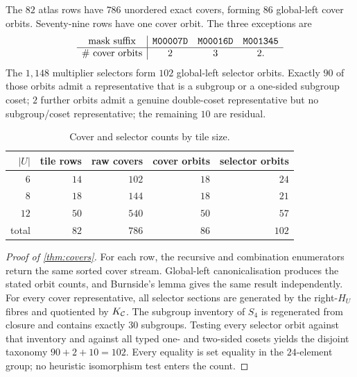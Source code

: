 \begin{theorem}\label{thm:covers}
The $82$ atlas rows have $786$ unordered exact covers, forming $86$
global-left cover orbits.  Seventy-nine rows have one cover orbit.  The three
exceptions are
\[
\begin{array}{c|ccc}
\text{mask suffix}&\texttt{M00007D}&\texttt{M00016D}&\texttt{M001345}\\ \hline
\#\text{ cover orbits}&2&3&2.
\end{array}
\]
The $1{,}148$ multiplier selectors form $102$ global-left selector orbits.
Exactly $90$ of those orbits admit a representative that is a subgroup or a
one-sided subgroup coset; $2$ further orbits admit a genuine double-coset
representative but no subgroup/coset representative; the remaining $10$ are
residual.
\end{theorem}

\begin{table}[ht]
\centering
\caption{Cover and selector counts by tile size.}
\label{tab:cover-by-k}
\begin{tabular}{@{}rrrrr@{}}
\toprule
$|U|$ & tile rows & raw covers & cover orbits & selector orbits\\
\midrule
$6$  & $14$ & $102$ & $18$ & $24$\\
$8$  & $18$ & $144$ & $18$ & $21$\\
$12$ & $50$ & $540$ & $50$ & $57$\\
\midrule
total & $82$ & $786$ & $86$ & $102$\\
\bottomrule
\end{tabular}
\end{table}

\begin{proof}[Proof of \cref{thm:covers}]
For each row, the recursive and combination enumerators return the same
sorted cover stream.  Global-left canonicalisation produces the stated
orbit counts, and Burnside's lemma gives the same result independently.
For every cover representative, all selector sections are generated by the
right-$H_U$ fibres and quotiented by $K_\mathcal C$.  The subgroup inventory of
$S_4$ is regenerated from closure and contains exactly $30$ subgroups.
Testing every selector orbit against that inventory and against all typed
one- and two-sided cosets yields the disjoint taxonomy $90+2+10=102$.
Every equality is set equality in the $24$-element group; no heuristic
isomorphism test enters the count.
\end{proof}

